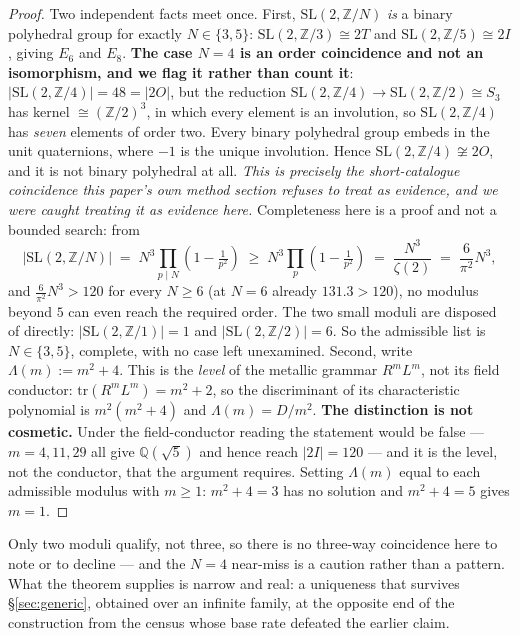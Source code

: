 \documentclass[11pt,a4paper]{article}
\theoremstyle{definition}
\theoremstyle{remark}
\newcommand{\Q}{\mathbb{Q}}
\newcommand{\Z}{\mathbb{Z}}
\begin{document}
\begin{proof}
Two independent facts meet once. First, $\mathrm{SL}(2,\Z/N)$ \emph{is} a binary polyhedral group for exactly $N \in \{3,5\}$:
$\mathrm{SL}(2,\Z/3) \cong 2T$ and $\mathrm{SL}(2,\Z/5) \cong 2I$, giving $E_6$ and $E_8$.
\textbf{The case $N=4$ is an order coincidence and not an isomorphism, and we flag it rather than
count it}: $|\mathrm{SL}(2,\Z/4)| = 48 = |2O|$, but the reduction
$\mathrm{SL}(2,\Z/4) \to \mathrm{SL}(2,\Z/2) \cong S_3$ has kernel $\cong (\Z/2)^3$, in which every
element is an involution, so $\mathrm{SL}(2,\Z/4)$ has \emph{seven} elements of order two. Every
binary polyhedral group embeds in the unit quaternions, where $-1$ is the unique involution. Hence
$\mathrm{SL}(2,\Z/4) \not\cong 2O$, and it is not binary polyhedral at all. \emph{This is precisely
the short-catalogue coincidence this paper's own method section refuses to treat as evidence, and we
were caught treating it as evidence here.} Completeness here is a proof and
not a bounded search: from
\[
  |\mathrm{SL}(2,\Z/N)| \;=\; N^3\!\!\prod_{p \mid N}\!\left(1 - \tfrac{1}{p^2}\right)
  \;\ge\; N^3 \prod_{p}\left(1 - \tfrac{1}{p^2}\right) \;=\; \frac{N^3}{\zeta(2)} \;=\; \frac{6}{\pi^2}N^3 ,
\]
and $\tfrac{6}{\pi^2}N^3 > 120$ for every $N \ge 6$ (at $N=6$ already $131.3 > 120$), no modulus
beyond $5$ can even reach the required order. The two small moduli are disposed of directly:
$|\mathrm{SL}(2,\Z/1)| = 1$ and $|\mathrm{SL}(2,\Z/2)| = 6$. So the admissible list is
$N \in \{3,5\}$, complete, with no case left unexamined. Second, write $\Lambda(m) := m^2+4$. This is the \emph{level} of the metallic grammar
$R^mL^m$, not its field conductor: $\mathrm{tr}(R^mL^m) = m^2+2$, so the discriminant of its
characteristic polynomial is $m^2(m^2+4)$ and $\Lambda(m) = D/m^2$. \textbf{The distinction is not
cosmetic.} Under the field-conductor reading the statement would be false --- $m = 4, 11, 29$ all
give $\Q(\sqrt5)$ and hence reach $|2I| = 120$ --- and it is the level, not the conductor, that the
argument requires. Setting $\Lambda(m)$ equal to each admissible modulus with $m \ge 1$: $m^2+4 = 3$ has no solution and $m^2+4 = 5$
gives $m = 1$. \qedhere
\end{proof}

\noindent Only two moduli qualify, not three, so there is no three-way coincidence here to note or to
decline --- and the $N=4$ near-miss is a caution rather than a pattern. What the theorem supplies is narrow and real: a uniqueness
that survives \S\ref{sec:generic}, obtained over an infinite family, at the opposite end of the
construction from the census whose base rate defeated the earlier claim.
\end{document}
